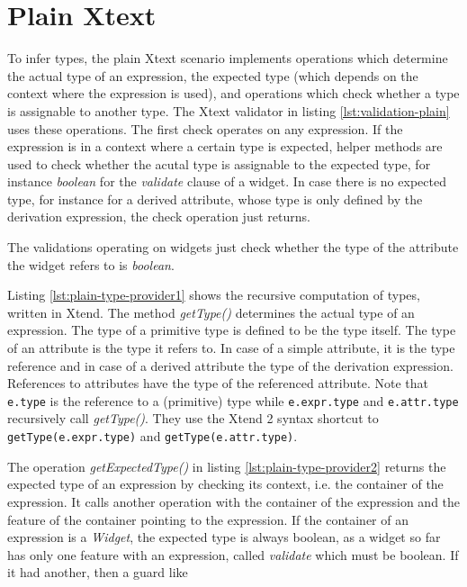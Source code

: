 \section{Plain Xtext}

To infer types, the plain Xtext scenario implements operations which determine the actual type of an expression, the expected type (which depends on the context where the expression is used), and operations which check whether a type is assignable to another type. The Xtext validator in listing \ref{lst:validation-plain} uses these operations. The first check operates on any expression. If the expression is in a context where a certain type is expected, helper methods are used to check whether the acutal type is assignable to the expected type, for instance \emph{boolean} for the \emph{validate} clause of a widget. 
In case there is no expected type, for instance for a derived attribute, whose type is only defined by the derivation expression, the check operation just returns.

The validations operating on widgets just check whether the type of the attribute the widget refers to is \emph{boolean}.




Listing \ref{lst:plain-type-provider1} shows the recursive computation of types, written in Xtend. The method \emph{getType()} determines the actual type of an expression. The type of a primitive type is defined to be the type itself. The type of an attribute is the type it refers to. In case of a simple attribute, it is the type reference and in case of a derived attribute the type of the derivation expression. References to attributes have the type of the referenced attribute. Note that \verb|e.type| is the reference to a (primitive) type while \verb|e.expr.type| and \verb|e.attr.type| recursively call \emph{getType()}. They use the Xtend 2 syntax shortcut to \verb|getType(e.expr.type)| and \verb|getType(e.attr.type)|.



The operation \emph{getExpectedType()} in listing \ref{lst:plain-type-provider2} returns the expected type of an expression by checking its context, i.e. the container of the expression. It calls another operation with the container of the expression and the feature of the container pointing to the expression. If the container of an expression is a \emph{Widget}, the expected type is always boolean, as a widget so far has only one feature with an expression, called \emph{validate} which must be boolean. If it had another, then a guard like

